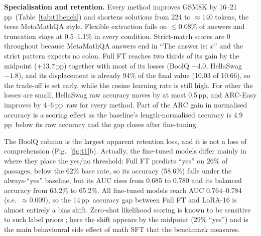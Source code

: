 \documentclass{article}
\newcommand{\pp}{\,pp}
\begin{document}
\textbf{Specialisation and retention.} Every method improves GSM8K by 16--21\pp\ (Table~\ref{tab:t1bench}) and shortens solutions from 224 to $\approx$140 tokens, the terse MetaMathQA style.  Flexible extraction fails on $\le$0.08\% of answers and truncation stays at 0.5--1.1\% in every condition. Strict-match scores are 0 throughout because MetaMathQA answers end in ``The answer is: $x$'' and the strict pattern expects no colon. Full FT reaches two thirds of its gain by the midpoint (+13.7\pp) together with most of its losses (BoolQ $-4.0$, HellaSwag $-1.8$), and its displacement is already 94\% of the final value (10.03 of 10.66), so the trade-off is set early, while the cosine learning rate is still high. For other the losses are  small, HellaSwag raw accuracy moves by at most 0.5\pp, and ARC-Easy improves by 4--6\pp\ raw for every method. Part of the ARC gain in normalised accuracy is a scoring effect as the baseline's length-normalised accuracy is 4.9\pp\ below its raw accuracy and the gap closes after fine-tuning.

The BoolQ column is the largest apparent retention loss, and it is not a loss of comprehension (Fig.~\ref{fig:t1}b). Actually,   the fine-tuned models differ mainly in where they place the yes/no threshold: Full FT predicts ``yes'' on 26\% of passages, below the 62\% base rate, so its accuracy (58.6\%) falls under the always-``yes'' baseline, but its AUC rises from 0.685 to 0.780 and its balanced accuracy from 63.2\% to 65.2\%. All fine-tuned models reach AUC 0.764--0.784 (s.e.\ $\approx$0.009), so the 14\pp\ accuracy gap between Full FT and LoRA-16 is almost entirely a bias shift. Zero-shot likelihood scoring is known to be sensitive to such label priors \citep{zhao2021calibrate}; here the shift appears by the midpoint (29\% ``yes'') and is the main behavioural side effect of math SFT that the benchmark measures.
\end{document}
